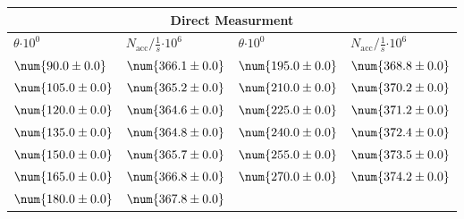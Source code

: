 \begin{tabular}{|p{}|p{}||p{}|p{}|}
\hline
\multicolumn{4}{|c|}{Direct Measurment}\\
\hline
$\theta$$\cdot 10^{0}$&$N_\text{acc}/\frac{1}{s}$$\cdot 10^{6}$&$\theta$$\cdot 10^{0}$&$N_\text{acc}/\frac{1}{s}$$\cdot 10^{6}$\\
\hline
$\num{90.0\pm 0.0}$&$\num{366.1\pm 0.0}$&$\num{195.0\pm 0.0}$&$\num{368.8\pm 0.0}$\\
$\num{105.0\pm 0.0}$&$\num{365.2\pm 0.0}$&$\num{210.0\pm 0.0}$&$\num{370.2\pm 0.0}$\\
$\num{120.0\pm 0.0}$&$\num{364.6\pm 0.0}$&$\num{225.0\pm 0.0}$&$\num{371.2\pm 0.0}$\\
$\num{135.0\pm 0.0}$&$\num{364.8\pm 0.0}$&$\num{240.0\pm 0.0}$&$\num{372.4\pm 0.0}$\\
$\num{150.0\pm 0.0}$&$\num{365.7\pm 0.0}$&$\num{255.0\pm 0.0}$&$\num{373.5\pm 0.0}$\\
$\num{165.0\pm 0.0}$&$\num{366.8\pm 0.0}$&$\num{270.0\pm 0.0}$&$\num{374.2\pm 0.0}$\\
$\num{180.0\pm 0.0}$&$\num{367.8\pm 0.0}$&&\\
\hline
\end{tabular}